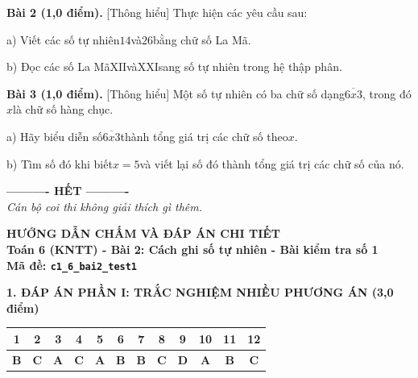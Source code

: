 \documentclass[11pt,a4paper]{article}
\begin{document}
\noindent\textbf{Bài 2 (1,0 điểm).} [Thông hiểu] Thực hiện các yêu cầu sau:\par\noindent a) Viết các số tự nhiên$14$và$26$bằng chữ số La Mã.\par\noindent b) Đọc các số La Mã$\mathrm{XII}$và$\mathrm{XXI}$sang số tự nhiên trong hệ thập phân.\par\vspace{8pt}

\noindent\textbf{Bài 3 (1,0 điểm).} [Thông hiểu] Một số tự nhiên có ba chữ số dạng$\overline{6x3}$, trong đó$x$là chữ số hàng chục.\par\noindent a) Hãy biểu diễn số$\overline{6x3}$thành tổng giá trị các chữ số theo$x$.\par\noindent b) Tìm số đó khi biết$x = 5$và viết lại số đó thành tổng giá trị các chữ số của nó.\par\vspace{8pt}


\begin{center}
\textbf{---------- HẾT ----------}\\
\textit{\small Cán bộ coi thi không giải thích gì thêm.}
\end{center}

\newpage
\begin{center}
{\Large\bfseries HƯỚNG DẪN CHẤM VÀ ĐÁP ÁN CHI TIẾT}\\[4pt]
{\large\bfseries Toán 6 (KNTT) - Bài 2: Cách ghi số tự nhiên - Bài kiểm tra số 1}\\[2pt]
{\bfseries Mã đề: \texttt{c1\_6\_bai2\_test1}}
\end{center}

\vspace{10pt}
\noindent\textbf{\large 1. ĐÁP ÁN PHẦN I: TRẮC NGHIỆM NHIỀU PHƯƠNG ÁN (3,0 điểm)}
\vspace{4pt}
\begin{center}
\begin{tabular}{|c|c|c|c|c|c|c|c|c|c|c|c|}
\hline
\textbf{1} & \textbf{2} & \textbf{3} & \textbf{4} & \textbf{5} & \textbf{6} & \textbf{7} & \textbf{8} & \textbf{9} & \textbf{10} & \textbf{11} & \textbf{12} \\
\hline
\textbf{B} & \textbf{C} & \textbf{A} & \textbf{C} & \textbf{A} & \textbf{B} & \textbf{B} & \textbf{C} & \textbf{D} & \textbf{A} & \textbf{B} & \textbf{C} \\
\hline
\end{tabular}
\end{center}
\vspace{6pt}
\end{document}
